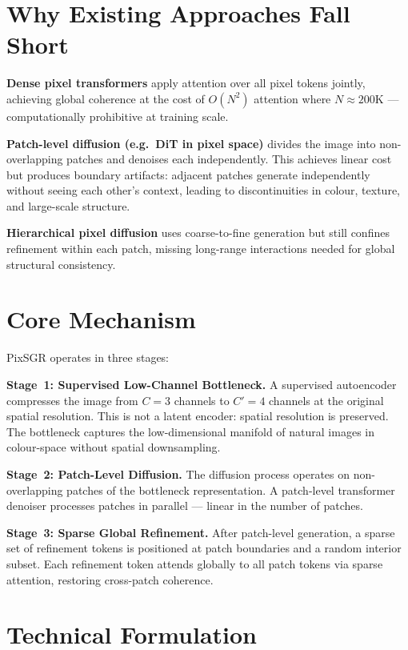 \documentclass[10pt,twocolumn]{article}
\begin{document}
\section{Why Existing Approaches Fall Short}

\textbf{Dense pixel transformers} apply attention over all pixel tokens
jointly, achieving global coherence at the cost of $O(N^2)$ attention
where $N \approx 200$K --- computationally prohibitive at training scale.

\textbf{Patch-level diffusion (e.g.\ DiT in pixel space)} divides the
image into non-overlapping patches and denoises each independently.
This achieves linear cost but produces boundary artifacts: adjacent
patches generate independently without seeing each other's context,
leading to discontinuities in colour, texture, and large-scale structure.

\textbf{Hierarchical pixel diffusion} uses coarse-to-fine generation
but still confines refinement within each patch, missing long-range
interactions needed for global structural consistency.

\section{Core Mechanism}

PixSGR operates in three stages:

\textbf{Stage~1: Supervised Low-Channel Bottleneck.}
A supervised autoencoder compresses the image from $C=3$ channels to
$C'=4$ channels at the original spatial resolution. This is not a
latent encoder: spatial resolution is preserved. The bottleneck captures
the low-dimensional manifold of natural images in colour-space without
spatial downsampling.

\textbf{Stage~2: Patch-Level Diffusion.}
The diffusion process operates on non-overlapping patches of the
bottleneck representation. A patch-level transformer denoiser processes
patches in parallel --- linear in the number of patches.

\textbf{Stage~3: Sparse Global Refinement.}
After patch-level generation, a sparse set of refinement tokens is
positioned at patch boundaries and a random interior subset. Each
refinement token attends globally to all patch tokens via sparse
attention, restoring cross-patch coherence.

\section{Technical Formulation}
\end{document}
